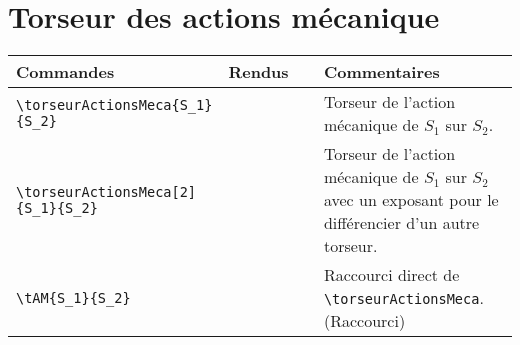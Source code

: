 \documentclass[a4paper,12pt]{article}
\newcommand{\rac}{({\color{red}Raccourci})}
\begin{document}
	\section{Torseur des actions mécanique}
		\noindent
		\begin{tabular}{|p{0.4\linewidth}|p{0.2\linewidth}|p{0.4\linewidth}|}
			\hline
				\textbf{Commandes}&\textbf{Rendus}&\textbf{Commentaires}
			\\\hline\hline
				\verb!\torseurActionsMeca{S_1}! \verb!{S_2}!		&	\torseurActionsMeca{S_1}{S_2}		&	Torseur de l'action mécanique de $S_1$ sur $S_2$.
			\\\hline
				\verb!\torseurActionsMeca[2]! \verb!{S_1}{S_2}!	&	\torseurActionsMeca[2]{S_1}{S_2}	&	Torseur de l'action mécanique de $S_1$ sur $S_2$ avec un exposant pour le différencier d'un autre torseur.
			\\\hline
				\verb!\tAM{S_1}{S_2}!					&	\tAM{S_1}{S_2}				&	Raccourci direct de \verb!\torseurActionsMeca!. \rac
			\\\hline
		\end{tabular}
\end{document}
